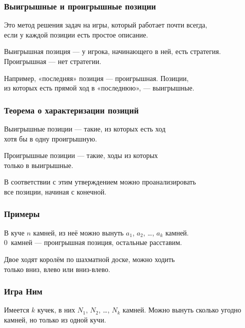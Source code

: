 \begin{frame} \frametitle{Выигрышные и проигрышные позиции}
Это метод решения задач на игры, который работает почти всегда, \\
если у каждой позиции есть простое описание. \bigskip

Выигрышная позиция — у игрока, начинающего в ней, есть стратегия. \\
Проигрышная — нет стратегии. \bigskip

Например, «последняя» позиция — проигрышная. Позиции, \\
из которых есть прямой ход в «последнюю», — выигрышные.
\end{frame}

\begin{frame} \frametitle{Теорема о характеризации позиций}
Выигрышные позиции — такие, из которых есть ход \\
хотя бы в одну проигрышную. \bigskip

Проигрышные позиции — такие, ходы из которых \\
только в выигрышные. \bigskip

В соответствии с этим утверждением можно проанализировать \\
все позиции, начиная с конечной.
\end{frame}

\begin{frame} \frametitle{Примеры}
В куче $n$ камней, из неё можно вынуть $a_1$, $a_2$, \ldots, $a_k$ камней. \\
0~камней — проигрышная позиция, остальные расставим. \pause

Двое ходят королём по шахматной доске, можно ходить \\
только вниз, влево или вниз-влево. \pause

\begin{center}  \end{center}
\end{frame}

\begin{frame} \frametitle{Игра Ним}
	Имеется $k$ кучек, в них $N_1$, $N_2$, \ldots, $N_k$ камней. Можно вынуть сколько угодно камней, но только из одной кучи. \medskip

\begin{center} \end{center}
\end{frame}



